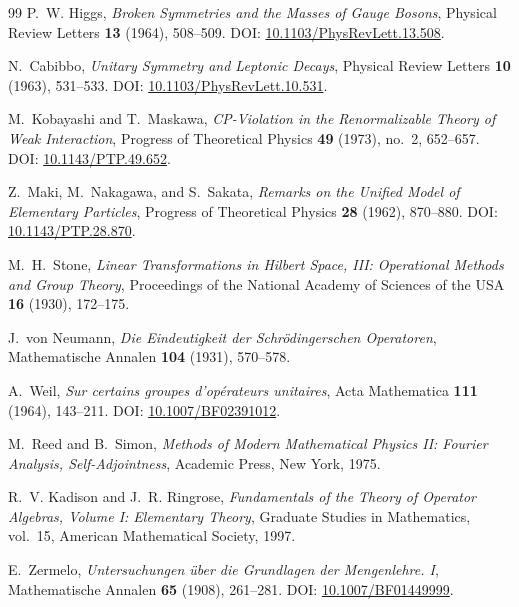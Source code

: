 \begin{thebibliography}{99}
P.~W. Higgs,
\emph{Broken Symmetries and the Masses of Gauge Bosons},
Physical Review Letters \textbf{13} (1964), 508--509.
\newblock DOI: \href{https://doi.org/10.1103/PhysRevLett.13.508}{10.1103/PhysRevLett.13.508}.

N.~Cabibbo,
\emph{Unitary Symmetry and Leptonic Decays},
Physical Review Letters \textbf{10} (1963), 531--533.
\newblock DOI: \href{https://doi.org/10.1103/PhysRevLett.10.531}{10.1103/PhysRevLett.10.531}.

M.~Kobayashi and T.~Maskawa,
\emph{CP-Violation in the Renormalizable Theory of Weak Interaction},
Progress of Theoretical Physics \textbf{49} (1973), no.~2, 652--657.
\newblock DOI: \href{https://doi.org/10.1143/PTP.49.652}{10.1143/PTP.49.652}.

Z.~Maki, M.~Nakagawa, and S.~Sakata,
\emph{Remarks on the Unified Model of Elementary Particles},
Progress of Theoretical Physics \textbf{28} (1962), 870--880.
\newblock DOI: \href{https://doi.org/10.1143/PTP.28.870}{10.1143/PTP.28.870}.

M.~H.~Stone,
\emph{Linear Transformations in Hilbert Space, III: Operational Methods and Group Theory},
Proceedings of the National Academy of Sciences of the USA \textbf{16} (1930), 172--175.

J.~von Neumann,
\emph{Die Eindeutigkeit der Schr\"odingerschen Operatoren},
Mathematische Annalen \textbf{104} (1931), 570--578.

A.~Weil,
\emph{Sur certains groupes d'op\'erateurs unitaires},
Acta Mathematica \textbf{111} (1964), 143--211.
\newblock DOI: \href{https://doi.org/10.1007/BF02391012}{10.1007/BF02391012}.

M.~Reed and B.~Simon,
\emph{Methods of Modern Mathematical Physics II: Fourier Analysis, Self-Adjointness},
Academic Press, New York, 1975.

R.~V. Kadison and J.~R. Ringrose,
\emph{Fundamentals of the Theory of Operator Algebras, Volume I: Elementary Theory},
Graduate Studies in Mathematics, vol.~15,
American Mathematical Society, 1997.

E.~Zermelo,
\emph{Untersuchungen \"uber die Grundlagen der Mengenlehre. I},
Mathematische Annalen \textbf{65} (1908), 261--281.
\newblock DOI: \href{https://doi.org/10.1007/BF01449999}{10.1007/BF01449999}.


\end{thebibliography}
